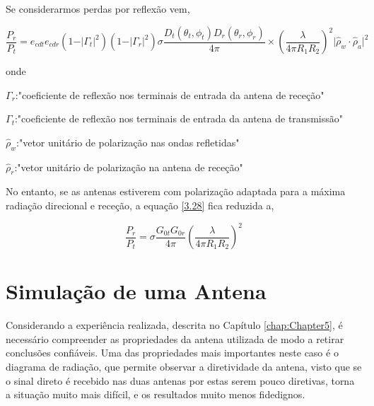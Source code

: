 Se considerarmos perdas por reflexão vem,  

\begin{equation} \label{3.28}
\dfrac{P_{r}}{P_{t}}=e_{cdt}e_{cdr}\left( 1-\vert\Gamma_{t}\vert^{2}\right)\left( 1-\vert\Gamma_{r}\vert^{2}\right)\sigma \dfrac{D_{t}\left( \theta_{t},\phi_{t}\right)D_{r}\left( \theta_{r},\phi_{r}\right) }{4\pi}\times\left( \dfrac{\lambda}{4\pi R_{1}R_{2}}\right)^{2}\vert\hat{\rho}_{w}\cdot \hat{\rho}_{a}\vert^{2}
\end{equation}

onde \par 
$\Gamma_{r}$:"coeficiente de reflexão nos terminais de entrada da antena de receção" \par
$\Gamma_{t}$:"coeficiente de reflexão nos terminais de entrada da antena de transmissão" \par
$\hat{\rho}_{w}$:"vetor unitário de polarização nas ondas refletidas"\par
$\hat{\rho}_{r}$:"vetor unitário de polarização na antena de receção"\par

No entanto, se as antenas estiverem com polarização adaptada para a máxima radiação direcional e receção, a equação \ref{3.28} fica reduzida a,

\begin{equation} \label{3.29}
\dfrac{P_{r}}{P_{t}}=\sigma \dfrac{G_{0t}G_{0r}}{4\pi}\left( \dfrac{\lambda}{4\pi R_{1}R_{2}}\right)^{2} 
\end{equation}








\section{Simulação de uma Antena}
Considerando a experiência realizada, descrita no Capítulo \ref{chap:Chapter5}, é necessário compreender as propriedades da antena utilizada de modo a retirar conclusões confiáveis. Uma das propriedades mais importantes neste caso é o diagrama de radiação, que permite observar a diretividade da antena, visto que se o sinal direto é recebido nas duas antenas por estas serem pouco diretivas, torna a situação muito mais difícil, e os resultados muito menos fidedignos.

